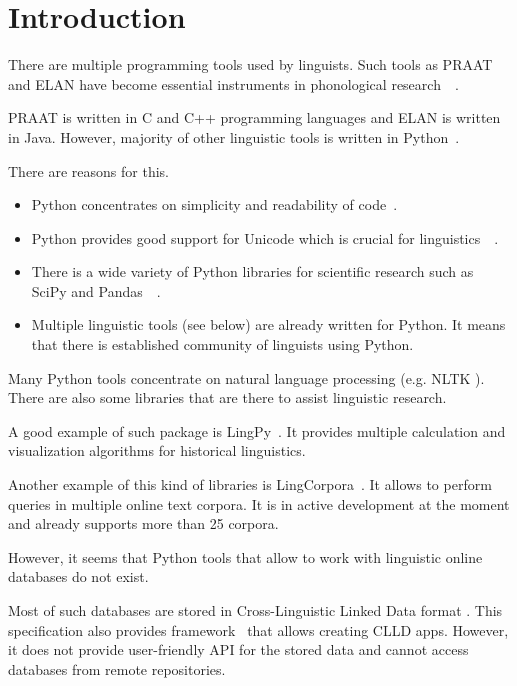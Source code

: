 \documentclass[a4paper,12pt]{article}
\begin{document}
\newpage
\section{Introduction}
There are multiple programming tools used by linguists. Such tools as PRAAT and ELAN have become essential instruments in phonological research~\parencite{praat}~\parencite{elan}.

PRAAT is written in C and C++ programming languages and ELAN is written in Java. However, majority of other linguistic tools is written in Python~\parencite{python}.

There are reasons for this.
\begin{itemize}
 \item Python concentrates on simplicity and readability of code~\parencite{zen}.
 \item Python provides good support for Unicode which is crucial for linguistics~\parencite{unicode}~\parencite{python}.
 \item There is a wide variety of Python libraries for scientific research such as SciPy and Pandas~\parencite{scipy}~\parencite{pandas}.
 \item Multiple linguistic tools (see below) are already written for Python. It means that there is established community of linguists using Python.
\end{itemize}

Many Python tools concentrate on natural language processing (e.g. NLTK \parencite{NLTK}). There are also some libraries that are there to assist linguistic research.

A good example of such package is LingPy~\parencite{List2017i}. It provides multiple calculation and visualization algorithms for historical linguistics.

Another example of this kind of libraries is LingCorpora~\parencite{alexey}. It allows to perform queries in multiple online text corpora. It is in active development at the moment and already supports more than 25 corpora.

However, it seems that Python tools that allow to work with linguistic online databases do not exist.

Most of such databases are stored in Cross-Linguistic Linked Data format \parencite{CLLD}. This specification also provides framework~\parencite{RobertForkel2019} that allows creating CLLD apps. However, it does not provide user-friendly API for the stored data and cannot access databases from remote repositories.
\end{document}

